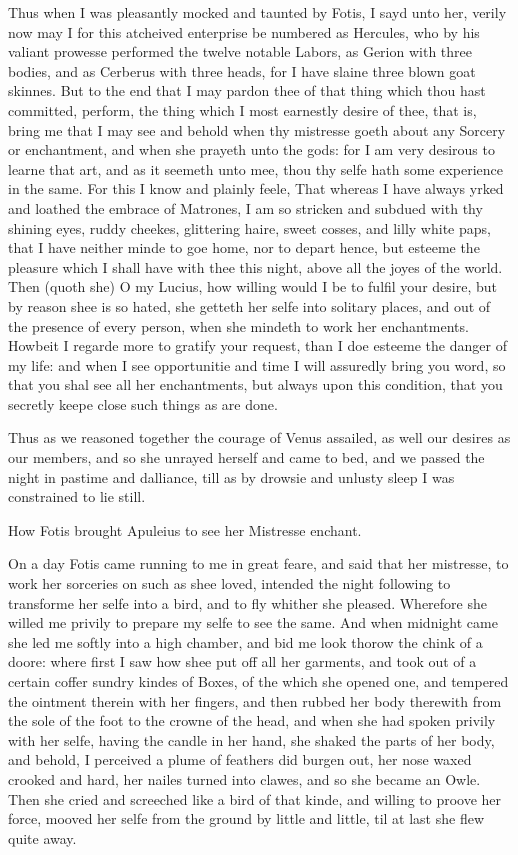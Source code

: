 Thus when I was pleasantly mocked and taunted by Fotis, I sayd unto her, verily
now may I for this atcheived enterprise be numbered as Hercules, who by his
valiant prowesse performed the twelve notable Labors, as Gerion with three
bodies, and as Cerberus with three heads, for I have slaine three blown goat
skinnes. But to the end that I may pardon thee of that thing which thou hast
committed, perform, the thing which I most earnestly desire of thee, that is,
bring me that I may see and behold when thy mistresse goeth about any Sorcery
or enchantment, and when she prayeth unto the gods: for I am very desirous to
learne that art, and as it seemeth unto mee, thou thy selfe hath some
experience in the same. For this I know and plainly feele, That whereas I have
always yrked and loathed the embrace of Matrones, I am so stricken and subdued
with thy shining eyes, ruddy cheekes, glittering haire, sweet cosses, and lilly
white paps, that I have neither minde to goe home, nor to depart hence, but
esteeme the pleasure which I shall have with thee this night, above all the
joyes of the world. Then (quoth she) O my Lucius, how willing would I be to
fulfil your desire, but by reason shee is so hated, she getteth her selfe into
solitary places, and out of the presence of every person, when she mindeth to
work her enchantments. Howbeit I regarde more to gratify your request, than I
doe esteeme the danger of my life: and when I see opportunitie and time I will
assuredly bring you word, so that you shal see all her enchantments, but always
upon this condition, that you secretly keepe close such things as are done.

Thus as we reasoned together the courage of Venus assailed, as well our desires
as our members, and so she unrayed herself and came to bed, and we passed the
night in pastime and dalliance, till as by drowsie and unlusty sleep I was
constrained to lie still.


How Fotis brought Apuleius to see her Mistresse enchant.

On a day Fotis came running to me in great feare, and said that her mistresse,
to work her sorceries on such as shee loved, intended the night following to
transforme her selfe into a bird, and to fly whither she pleased. Wherefore she
willed me privily to prepare my selfe to see the same. And when midnight came
she led me softly into a high chamber, and bid me look thorow the chink of a
doore: where first I saw how shee put off all her garments, and took out of a
certain coffer sundry kindes of Boxes, of the which she opened one, and
tempered the ointment therein with her fingers, and then rubbed her body
therewith from the sole of the foot to the crowne of the head, and when she had
spoken privily with her selfe, having the candle in her hand, she shaked the
parts of her body, and behold, I perceived a plume of feathers did burgen out,
her nose waxed crooked and hard, her nailes turned into clawes, and so she
became an Owle. Then she cried and screeched like a bird of that kinde, and
willing to proove her force, mooved her selfe from the ground by little and
little, til at last she flew quite away.

